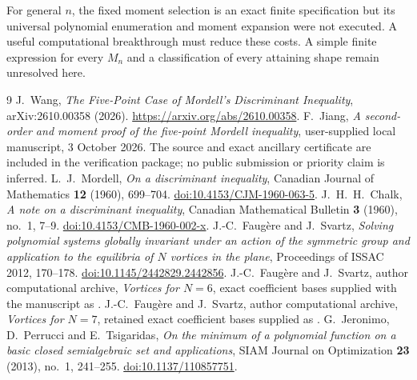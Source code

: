 \documentclass[11pt]{article}
\theoremstyle{remark}
\numberwithin{equation}{section}
\begin{document}
For general $n$, the fixed moment
selection is an exact finite specification but its universal polynomial
enumeration and moment expansion were not executed. A useful computational
breakthrough must reduce these costs. A simple finite expression for every
$M_n$ and a classification of every attaining shape remain unresolved here.

\begin{thebibliography}{9}
J.~Wang, \emph{The Five-Point Case of Mordell's Discriminant Inequality},
arXiv:2610.00358 (2026).
\url{https://arxiv.org/abs/2610.00358}.
F.~Jiang, \emph{A second-order and moment proof of the five-point Mordell
inequality}, user-supplied local manuscript, 3 October 2026.
The source and exact ancillary certificate are included in the verification
package; no public submission or priority claim is inferred.
L.~J.~Mordell, \emph{On a discriminant inequality},
Canadian Journal of Mathematics \textbf{12} (1960), 699--704.
\href{https://doi.org/10.4153/CJM-1960-063-5}{doi:10.4153/CJM-1960-063-5}.
J.~H.~H.~Chalk, \emph{A note on a discriminant inequality},
Canadian Mathematical Bulletin \textbf{3} (1960), no.~1, 7--9.
\href{https://doi.org/10.4153/CMB-1960-002-x}{doi:10.4153/CMB-1960-002-x}.
J.-C.~Faug\`ere and J.~Svartz,
\emph{Solving polynomial systems globally invariant under an action of
the symmetric group and application to the equilibria of $N$ vortices
in the plane}, Proceedings of ISSAC 2012, 170--178.
\href{https://doi.org/10.1145/2442829.2442856}{doi:10.1145/2442829.2442856}.
J.-C.~Faug\`ere and J.~Svartz, author computational archive,
\emph{Vortices for $N=6$}, exact coefficient bases supplied with the
manuscript as .
J.-C.~Faug\`ere and J.~Svartz, author computational archive,
\emph{Vortices for $N=7$}, retained exact coefficient bases supplied as
.
G.~Jeronimo, D.~Perrucci and E.~Tsigaridas,
\emph{On the minimum of a polynomial function on a basic closed
semialgebraic set and applications},
SIAM Journal on Optimization \textbf{23} (2013), no.~1, 241--255.
\href{https://doi.org/10.1137/110857751}{doi:10.1137/110857751}.
\end{thebibliography}
\end{document}
